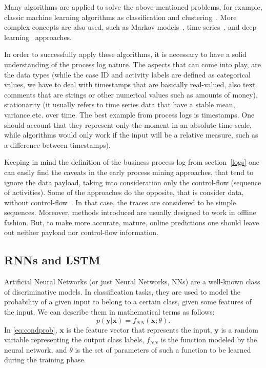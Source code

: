 \par
Many algorithms are applied to solve the above-mentioned problems, for example, classic machine learning algorithms as classification and clustering~\cite{Leontjeva2015}. More complex concepts are also used, such as Markov models~\cite{Leontjeva2015}, time series~\cite{Lam20096986}, and deep learning~\cite{niek96732,evermann,quteprints96732} approaches. 
\par
In order to successfully apply these algorithms, it is necessary to have a solid understanding of the process log nature. The aspects that can come into play, are the data types (while the case ID and activity labels are defined as categorical values, we have to deal with timestamps that are basically real-valued, also text comments that are strings or other numerical values such as amounts of money), stationarity (it usually refers to time series data that have a stable mean, variance etc. over time. The best example from process logs is timestamps. One should account that they represent only the moment in an absolute time scale, while algorithms would only work if the input will be a relative measure, such as a difference between timestamps). 
\par
Keeping in mind the definition of the business process log from section~\ref{logs} one can easily find the caveats in the early process mining approaches, that tend to ignore the data payload, taking into consideration only the control-flow (sequence of activities). Some of the approaches do the opposite, that is consider data, without control-flow~\cite{vanderAalst2010,DBLP:journals/is/AalstSS11,Schonenberg2008}. In that case, the traces are considered to be simple sequences. Moreover, methods introduced are usually designed to work in offline fashion. But, to make more accurate, mature, online predictions one should leave out neither payload nor control-flow information. 


\subsection{RNNs and LSTM}
Artificial Neural Networks (or just Neural Networks, NNs) are a well-known class of discriminative models. In classification tasks, they are
used to model the probability of a given input to belong to a certain
class, given some features of the input. We can describe them in
mathematical terms as follows:
%
\begin{equation}
  \label{eq:condprob}
  p(\mathbf{y}|\mathbf{x}) = f_{\mathit{NN}}(\mathbf{x}; \theta).
\end{equation}
%
In \eqref{eq:condprob}, $\mathbf{x}$ is the feature vector that represents the input,
$\mathbf{y}$ is a random variable representing the output class
labels, $f_{\mathit{NN}}$ is the function modeled by the neural network, and
$\theta$ is the set of parameters of such a function to be learned during
the training phase.


